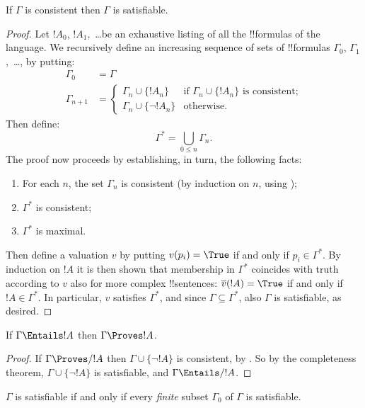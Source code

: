 \documentclass[../../../include/open-logic-section]{subfiles}
\begin{document}
\begin{thm}[Completeness] 
If $\Gamma$ is consistent then $\Gamma$ is satisfiable.
\end{thm}

\begin{proof}
Let $!A_0$, $!A_1$,~\dots be an exhaustive listing of all the
!!{formula}s of the language. We recursively define an increasing
sequence of sets of !!{formula}s $\Gamma_0$, $\Gamma_1$,~\dots, by
putting:
\begin{align*}
\Gamma_0 & = \Gamma\\
\Gamma_{n+1} &  =
\begin{cases}
  \Gamma_n \cup \{!A_n\} & \text{if $\Gamma_n \cup \{!A_n\}$ is
    consistent;}\\
  \Gamma_n \cup \{\lnot !A_n\} & \text{otherwise}.
\end{cases}
\end{align*}
Then define:
\[
\Gamma^* = \bigcup_{0\le n}\Gamma_n.
\]
The proof now proceeds by establishing, in turn, the following
facts:
\begin{enumerate}
\item For each $n$, the set $\Gamma_n$ is consistent (by induction on
  $n$, using );
\item $\Gamma^*$ is consistent;
\item $\Gamma^*$ is maximal.
\end{enumerate}
Then define a valuation $v$ by putting $v(p_i) = \True$ if and
only if $p_i \in \Gamma^*$. By induction on $!A$ it is then shown that
membership in $\Gamma^*$ coincides with truth according to $v$ also
for more complex !!{sentence}s: $\overline{v}(!A) = \True$ if and
only if $!A \in \Gamma^*$. In particular, $v$ satisfies $\Gamma^*$, and
since $\Gamma \subseteq \Gamma^*$, also $\Gamma$ is satisfiable, as
desired.
\end{proof}

\begin{cor}
If $\Gamma \Entails !A$ then $\Gamma \Proves !A$.
\end{cor}

\begin{proof}
If $\Gamma\Proves/ !A$ then $\Gamma \cup \{\lnot !A\}$ is consistent,
by . So by the completeness theorem, $\Gamma \cup
\{\lnot !A\}$ is satisfiable, and $\Gamma \Entails/ !A$.
\end{proof}

\begin{prop}
$\Gamma$ is satisfiable if and only if every \emph{finite} subset
$\Gamma_0$ of $\Gamma$ is satisfiable.
\end{prop}
\end{document}
